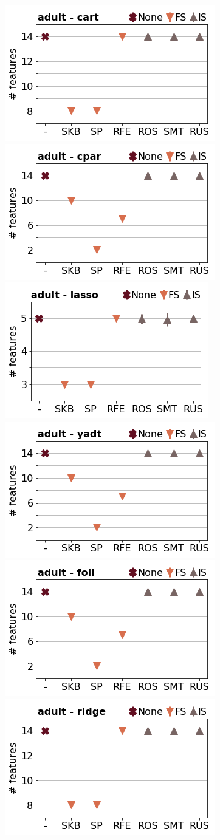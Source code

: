 \documentclass[runningheads,a4paper]{llncs}
\begin{document}
\begin{figure}[!h]
\includegraphics[width=0.32\linewidth]{fig/preps_adult_DT_sklearn_nbr_features.png}
\includegraphics[width=0.32\linewidth]{fig/preps_adult_RB_cpar_nbr_features.png}
\includegraphics[width=0.32\linewidth]{fig/preps_adult_LM_lasso_nbr_features.png}
\includegraphics[width=0.32\linewidth]{fig/preps_adult_DT_yadt_nbr_features.png}
\includegraphics[width=0.32\linewidth]{fig/preps_adult_RB_foil_nbr_features.png}
\includegraphics[width=0.32\linewidth]{fig/preps_adult_LM_ridge_nbr_features.png}
\end{figure}
\end{document}
